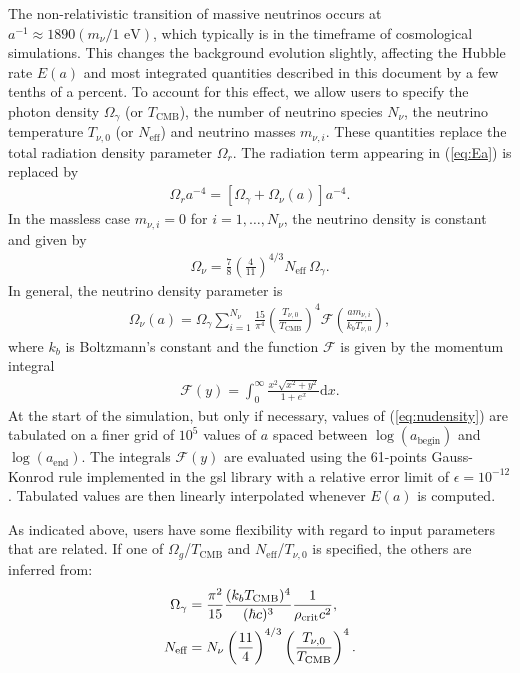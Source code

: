 The non-relativistic transition of massive neutrinos occurs at
$a^{-1}\approx 1890 (m_\nu/1\text{ eV})$, which typically is in the timeframe of
cosmological simulations. This changes the background evolution slightly,
affecting the Hubble rate $E(a)$ and most integrated quantities described in this
document by a few tenths of a percent. To account for this effect, we allow users
to specify the photon density $\Omega_\gamma$ (or $T_\text{CMB}$), the number of
neutrino species $N_\nu$, the neutrino temperature $T_{\nu,0}$ (or $N_\text{eff}$)
and neutrino masses $m_{\nu,i}$. These quantities replace the total radiation
density parameter $\Omega_r$. The radiation term appearing in (\ref{eq:Ea}) is
replaced by
\begin{align}
    \Omega_r a^{-4} = \left[\Omega_\gamma + \Omega_\nu(a)\right] a^{-4}.
\end{align}
In the massless case $m_{\nu,i}=0$ for $i=1,\dots,N_\nu$, the neutrino density is constant and given by
\begin{align}
    \Omega_\nu = \frac{7}{8}\left(\frac{4}{11}\right)^{4/3} N_\text{eff}\,\Omega_\gamma.
\end{align}
In general, the neutrino density parameter is \citep{Zennaro2016}
\begin{align}
    \Omega_\nu(a) = \Omega_\gamma \sum_{i=1}^{N_\nu}\frac{15}{\pi^4}\left(\frac{T_{\nu,0}}{T_\text{CMB}}\right)^4 \mathcal{F}\left(\frac{a m_{\nu,i}}{k_b T_{\nu,0}}\right), \label{eq:nudensity}
\end{align}
where $k_b$ is Boltzmann's constant and the function $\mathcal{F}$ is given by the momentum integral
%
\begin{align}
    \mathcal{F}(y) = \int_0^{\infty} \frac{x^2\sqrt{x^2+y^2}}{1+e^{x}}\mathrm{d}x.
\end{align}
At the start of the simulation, but only if necessary, values of
(\ref{eq:nudensity}) are tabulated on a finer grid of $10^5$ values of $a$ spaced
between $\log(a_\text{begin})$ and $\log(a_\text{end})$. The integrals
$\mathcal{F}(y)$ are evaluated using the 61-points Gauss-Konrod rule implemented
in the {\sc gsl} library with a relative error limit of $\epsilon=10^{-12}$.
Tabulated values are then linearly interpolated whenever $E(a)$ is computed.

As indicated above, users have some flexibility with regard to input parameters
that are related. If one of $\Omega_g$/$T_\text{CMB}$ and $N_\text{eff}$/$T_{\nu,0}$
is specified, the others are inferred from:
%
\begin{align}
    \Omega_\gamma &= \frac{\pi^2}{15}\frac{(k_b T_\text{CMB})^4}{(\hbar c)^3}\frac{1}{\rho_{\rm crit}c^2},\\
    N_\text{eff} &= N_\nu\left(\frac{11}{4}\right)^{4/3}\left(\frac{T_{\nu,0}}{T_\text{CMB}}\right)^4.
\end{align}
